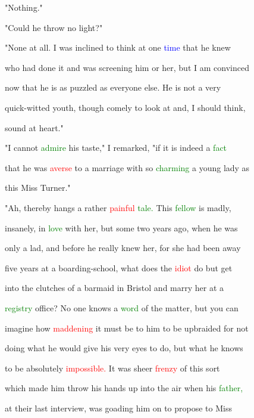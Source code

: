  "Nothing."



 "Could he throw no light?"



 "None at all. I was inclined to think at one \textcolor{blue}{time} that he knew

 who had done it and was screening him or her, but I am \textcolor{BurntOrange}{convinced}

 now that he is as puzzled as everyone else. He is not a very

 quick-witted \textcolor{BurntOrange}{youth,} though comely to look at and, I should think,

 sound at heart."



 "I cannot \textcolor{green}{admire} his taste," I remarked, "if it is indeed a \textcolor{green}{fact}

 that he was \textcolor{red}{averse} to a \textcolor{BurntOrange}{marriage} with so \textcolor{green}{charming} a \textcolor{BurntOrange}{young} lady as

 this Miss Turner."



 "Ah, thereby hangs a rather \textcolor{red}{painful} \textcolor{green}{tale.} This \textcolor{green}{fellow} is madly,

 insanely, in \textcolor{green}{love} with her, but some two years ago, when he was

 only a lad, and before he really knew her, for she had been away

 five years at a boarding-school, what does the \textcolor{red}{idiot} do but get

 into the clutches of a barmaid in Bristol and \textcolor{BurntOrange}{marry} her at a

 \textcolor{green}{registry} office? No one knows a \textcolor{green}{word} of the matter, but you can

 imagine how \textcolor{red}{maddening} it must be to him to be upbraided for not

 doing what he would give his very eyes to do, but what he knows

 to be absolutely \textcolor{red}{impossible.} It was sheer \textcolor{red}{frenzy} of this sort

 which made him throw his hands up into the air when his \textcolor{green}{father,}

 at their last interview, was goading him on to propose to Miss

